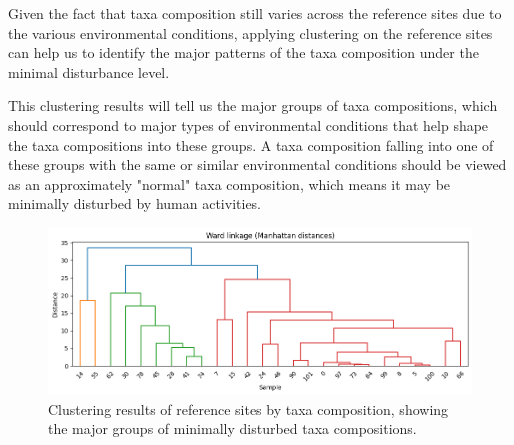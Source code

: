 Given the fact that taxa composition still varies across the reference sites due to the various environmental conditions,
applying clustering on the reference sites can help us to identify the major patterns of the taxa composition
under the minimal disturbance level.

This clustering results will tell us the major groups of taxa compositions, 
which should correspond to major types of environmental conditions that help shape the taxa compositions into these groups.
A taxa composition falling into one of these groups with the same or similar environmental conditions
should be viewed as an approximately "normal" taxa composition, which means it may be minimally disturbed by human activities.

\begin{center}
\end{center}

\begin{figure}[!h]
    \centering
    \includegraphics[width=\textwidth]{../results/preliminary_results/clustering_on_references_taxa.png}
    \caption{Clustering results of reference sites by taxa composition, showing the major groups of minimally disturbed taxa compositions.}
    \label{fig:clustering_on_references_taxa}
\end{figure}

